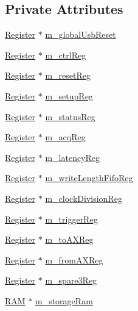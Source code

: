 \subsection*{Private Attributes}
\begin{DoxyCompactItemize}
\item 
\hyperlink{classRegister}{Register} $\ast$ \hyperlink{classA3PE_abd71e0c273f9e211e1a9302019129aff}{m\+\_\+global\+Usb\+Reset}
\item 
\hyperlink{classRegister}{Register} $\ast$ \hyperlink{classA3PE_a264834484dd6326ebad58c2a3e1be9a6}{m\+\_\+ctrl\+Reg}
\item 
\hyperlink{classRegister}{Register} $\ast$ \hyperlink{classA3PE_ab4db5f00976e5095686f108c8febf702}{m\+\_\+reset\+Reg}
\item 
\hyperlink{classRegister}{Register} $\ast$ \hyperlink{classA3PE_a142fa10b7e705c4701ae21678ec2ec8a}{m\+\_\+setup\+Reg}
\item 
\hyperlink{classRegister}{Register} $\ast$ \hyperlink{classA3PE_a2281e3d12a2dffad99ec55be2b695f53}{m\+\_\+status\+Reg}
\item 
\hyperlink{classRegister}{Register} $\ast$ \hyperlink{classA3PE_abaf426f4c9192537117b77f9f4821e04}{m\+\_\+acq\+Reg}
\item 
\hyperlink{classRegister}{Register} $\ast$ \hyperlink{classA3PE_a96a167e73e264da5a18d9ddb5ebb5f23}{m\+\_\+latency\+Reg}
\item 
\hyperlink{classRegister}{Register} $\ast$ \hyperlink{classA3PE_a9a0cb2253ea34c0be567a03684217fee}{m\+\_\+write\+Length\+Fifo\+Reg}
\item 
\hyperlink{classRegister}{Register} $\ast$ \hyperlink{classA3PE_ae1f4c24a99c2e6ae944a080f429cc155}{m\+\_\+clock\+Division\+Reg}
\item 
\hyperlink{classRegister}{Register} $\ast$ \hyperlink{classA3PE_a750158ae488121ab7969452f061e678c}{m\+\_\+trigger\+Reg}
\item 
\hyperlink{classRegister}{Register} $\ast$ \hyperlink{classA3PE_abe8eb76e3c0d967403726143deb1b70f}{m\+\_\+to\+A\+X\+Reg}
\item 
\hyperlink{classRegister}{Register} $\ast$ \hyperlink{classA3PE_acbfe708ac0a81243959c96124f192b9e}{m\+\_\+from\+A\+X\+Reg}
\item 
\hyperlink{classRegister}{Register} $\ast$ \hyperlink{classA3PE_a1e7e5c89f190672990ae5bece2a8b1aa}{m\+\_\+spare3\+Reg}
\item 
\hyperlink{classRAM}{R\+AM} $\ast$ \hyperlink{classA3PE_a41e317474e0c6e63bad4648903279be9}{m\+\_\+storage\+Ram}

\end{DoxyCompactItemize}
